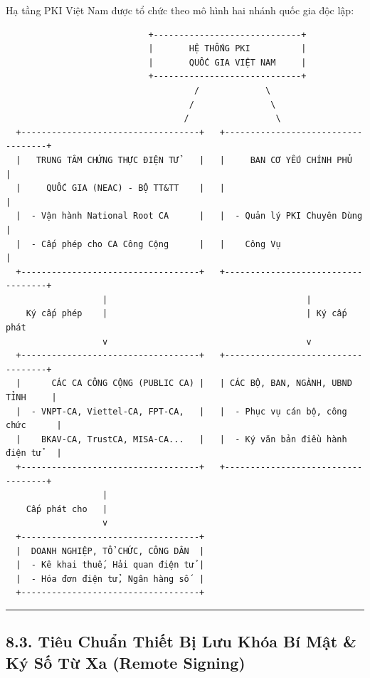 \documentclass[
]{article}
\begin{document}
Hạ tầng PKI Việt Nam được tổ chức theo mô hình hai nhánh quốc gia độc
lập:

\begin{verbatim}
                            +-----------------------------+
                            |       HỆ THỐNG PKI          |
                            |       QUỐC GIA VIỆT NAM     |
                            +-----------------------------+
                                     /             \
                                    /               \
                                   /                 \
  +-----------------------------------+   +-----------------------------------+
  |   TRUNG TÂM CHỨNG THỰC ĐIỆN TỬ    |   |     BAN CƠ YẾU CHÍNH PHỦ          |
  |     QUỐC GIA (NEAC) - BỘ TT&TT    |   |                                   |
  |  - Vận hành National Root CA      |   |  - Quản lý PKI Chuyên Dùng        |
  |  - Cấp phép cho CA Công Cộng      |   |    Công Vụ                        |
  +-----------------------------------+   +-----------------------------------+
                   |                                       |
    Ký cấp phép    |                                       | Ký cấp phát
                   v                                       v
  +-----------------------------------+   +-----------------------------------+
  |      CÁC CA CÔNG CỘNG (PUBLIC CA) |   | CÁC BỘ, BAN, NGÀNH, UBND TỈNH     |
  |  - VNPT-CA, Viettel-CA, FPT-CA,   |   |  - Phục vụ cán bộ, công chức      |
  |    BKAV-CA, TrustCA, MISA-CA...   |   |  - Ký văn bản điều hành điện tử   |
  +-----------------------------------+   +-----------------------------------+
                   |
    Cấp phát cho   |
                   v
  +-----------------------------------+
  |  DOANH NGHIỆP, TỔ CHỨC, CÔNG DÂN  |
  |  - Kê khai thuế, Hải quan điện tử |
  |  - Hóa đơn điện tử, Ngân hàng số  |
  +-----------------------------------+
\end{verbatim}

\begin{center}\rule{0.5\linewidth}{0.5pt}\end{center}

\subsection{8.3. Tiêu Chuẩn Thiết Bị Lưu Khóa Bí Mật \& Ký Số Từ Xa
(Remote
Signing)}\label{tiuxeau-chuux1ea9n-thiux1ebft-bux1ecb-lux1b0u-khuxf3a-buxed-mux1eadt-kuxfd-sux1ed1-tux1eeb-xa-remote-signing}
\end{document}
